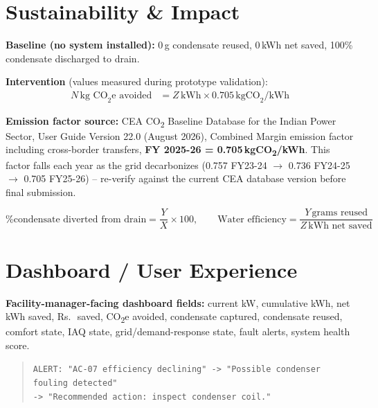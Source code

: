 \documentclass[11pt,a4paper]{article}
\newcommand{\textrupee}{Rs.\,}
\begin{document}
\section{Sustainability \& Impact}

\textbf{Baseline (no system installed):} 0\,g condensate reused, 0\,kWh net saved, 100\% condensate discharged to drain.

\textbf{Intervention} (values measured during prototype validation):
\begin{align}
N\,\text{kg CO}_2\text{e avoided} &= Z\,\text{kWh} \times 0.705\,\text{kgCO}_2\text{/kWh}
\end{align}

\textbf{Emission factor source:} CEA CO\textsubscript{2} Baseline Database for the Indian Power Sector, User Guide Version 22.0 (August 2026), Combined Margin emission factor including cross-border transfers, \textbf{FY 2025-26 = 0.705\,kgCO\textsubscript{2}/kWh}. This factor falls each year as the grid decarbonizes (0.757 FY23-24 $\rightarrow$ 0.736 FY24-25 $\rightarrow$ 0.705 FY25-26) -- re-verify against the current CEA database version before final submission.

\begin{equation}
\text{\% condensate diverted from drain} = \frac{Y}{X} \times 100, \qquad
\text{Water efficiency} = \frac{Y\,\text{grams reused}}{Z\,\text{kWh net saved}}
\end{equation}

\section{Dashboard / User Experience}

\textbf{Facility-manager-facing dashboard fields:} current kW, cumulative kWh, net kWh saved, \textrupee\ saved, CO\textsubscript{2}e avoided, condensate captured, condensate reused, comfort state, IAQ state, grid/demand-response state, fault alerts, system health score.

\begin{quote}
\small
\texttt{ALERT: "AC-07 efficiency declining" -> "Possible condenser fouling detected"} \\
\texttt{-> "Recommended action: inspect condenser coil."}
\end{quote}
\end{document}
